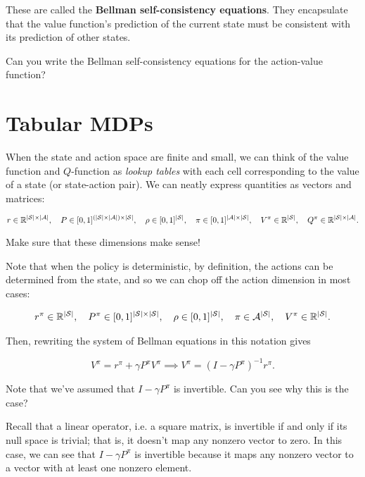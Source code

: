 \documentclass[../main/main]{subfiles}
\begin{document}
These are called the \textbf{Bellman self-consistency equations}. They encapsulate that the value function's prediction of the current state must be consistent with its prediction of other states.

Can you write the Bellman self-consistency equations for the action-value function?


\section{Tabular MDPs}

When the state and action space are finite and small, we can think of the value function and $Q$-function as \emph{lookup tables} with each cell corresponding to the value of a state (or state-action pair). We can neatly express quantities as vectors and matrices:

\[
    r \in \mathbb{R}^{|\mathcal{S}| \times |\mathcal{A}|}, \quad P \in [0, 1]^{(|\mathcal{S}| \times |\mathcal{A}|) \times |\mathcal{S}|}, \quad \rho \in [0, 1]^{|\mathcal{S}|}, \quad \pi \in [0, 1]^{|\mathcal{A}| \times |\mathcal{S}|}, \quad V^\pi \in \mathbb{R}^{|\mathcal{S}|}, \quad Q^\pi \in \mathbb{R}^{|\mathcal{S}| \times |\mathcal{A}|}.
\]

Make sure that these dimensions make sense!

Note that when the policy is deterministic, by definition, the actions can be determined from the state, and so we can chop off the action dimension in most cases:

\begin{align*}
    r^{\pi} \in \mathbb{R}^{|\mathcal{S}|}, \quad P^{\pi} \in [0, 1]^{|\mathcal{S}| \times |\mathcal{S}|}, \quad \rho \in [0, 1]^{|\mathcal{S}|}, \quad \pi \in \mathcal{A}^{|\mathcal{S}|}, \quad V^\pi \in \mathbb{R}^{|\mathcal{S}|}.
\end{align*}

Then, rewriting the system of Bellman equations in this notation gives

\[
    V^\pi = r^\pi + \gamma P^\pi V^\pi \implies V^\pi = (I - \gamma P^\pi)^{-1} r^\pi.
\]

Note that we've assumed that $I - \gamma P^\pi$ is invertible. Can you see why this is the case?

Recall that a linear operator, i.e. a square matrix, is invertible if and only if its null space is trivial; that is, it doesn't map any nonzero vector to zero. In this case, we can see that $I - \gamma P^\pi$ is invertible because it maps any nonzero vector to a vector with at least one nonzero element.

\end{document}
